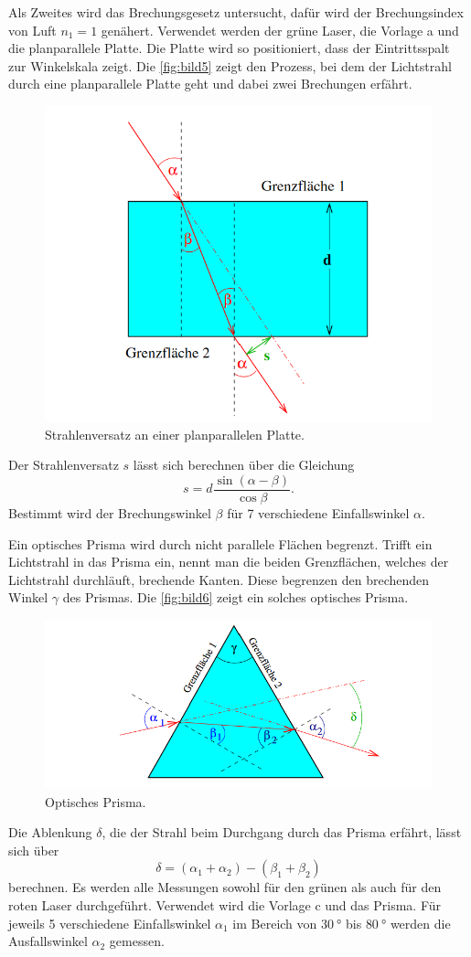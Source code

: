 Als Zweites wird das Brechungsgesetz untersucht, dafür wird der Brechungsindex von Luft $n_1 = 1$ genähert.
Verwendet werden der grüne Laser, die Vorlage a und die planparallele Platte. Die Platte wird so positioniert, dass 
der Eintrittsspalt zur Winkelskala zeigt. Die \autoref{fig:bild5} zeigt den Prozess, bei dem der Lichtstrahl durch eine planparallele
Platte geht und dabei zwei Brechungen erfährt.
\begin{figure}[H]
    \centering
	\includegraphics[width=0.6\linewidth]{content/grafik/strahlen.png}
	\caption{Strahlenversatz an einer planparallelen Platte. \cite{reflex}}
	\label{fig:bild5}
\end{figure}
Der Strahlenversatz $s$ lässt sich berechnen über die Gleichung 
\begin{equation}
	s=d \frac{\sin (\alpha-\beta)}{\cos \beta}.
	\end{equation}
Bestimmt wird der Brechungswinkel $\beta$ für 7 verschiedene Einfallswinkel $\alpha$.

Ein optisches Prisma wird durch nicht parallele Flächen begrenzt. Trifft ein Lichtstrahl in das Prisma ein,
nennt man die beiden Grenzflächen, welches der Lichtstrahl durchläuft, brechende Kanten. Diese begrenzen den brechenden Winkel 
$\gamma$ des Prismas. Die \autoref{fig:bild6} zeigt ein solches optisches Prisma.
\begin{figure}[H]
    \centering
	\includegraphics[width=0.6\linewidth]{content/grafik/prisma.png}
	\caption{Optisches Prisma. \cite{reflex}}
	\label{fig:bild6}
\end{figure}
Die Ablenkung $\delta$, die der Strahl beim Durchgang durch das Prisma erfährt, lässt sich über 
\begin{equation}
	\delta = \left(\alpha_1 + \alpha_2\right) - \left(\beta_1 + \beta_2\right)
\end{equation}
berechnen.
Es werden alle Messungen sowohl für den grünen als auch für den roten Laser durchgeführt. Verwendet wird die Vorlage c
und das Prisma. Für jeweils 5 verschiedene Einfallswinkel $\alpha_1$ im Bereich von $\qty{30}{°}$ bis $\qty{80}{°}$ werden die Ausfallswinkel $\alpha_2$ gemessen.

